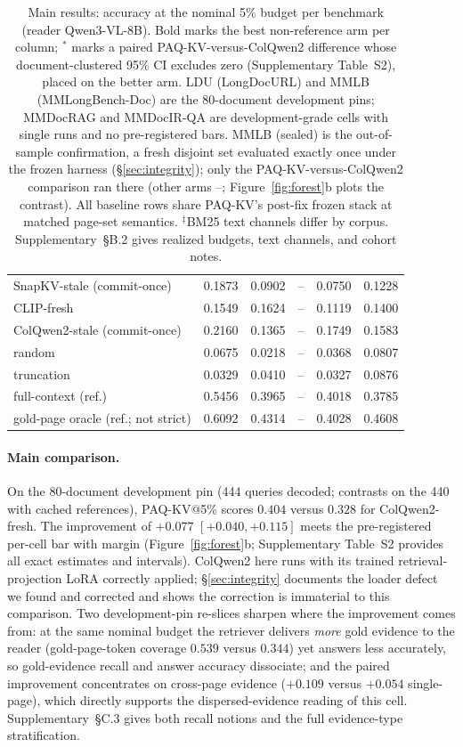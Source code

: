 \documentclass[letterpaper]{article} %
\newcommand{\paqc}{\textsc{PAQ-KV}}
\begin{document}
\begin{table}[t]
\begin{tabular}{lccccc}
SnapKV-stale (commit-once) & 0.1873 & 0.0902 & -- & 0.0750 & 0.1228 \\
CLIP-fresh & 0.1549 & 0.1624 & -- & 0.1119 & 0.1400 \\
ColQwen2-stale (commit-once) & 0.2160 & 0.1365 & -- & 0.1749 & 0.1583 \\
random & 0.0675 & 0.0218 & -- & 0.0368 & 0.0807 \\
truncation & 0.0329 & 0.0410 & -- & 0.0327 & 0.0876 \\
\midrule
full-context (ref.) & 0.5456 & 0.3965 & -- & 0.4018 & 0.3785 \\
gold-page oracle (ref.; not strict) & 0.6092 & 0.4314 & -- & 0.4028 & 0.4608 \\
\bottomrule
\end{tabular}
\caption{Main results: accuracy at the nominal 5\% budget per benchmark
(reader Qwen3-VL-8B). Bold marks the best non-reference arm per column;
$^{*}$ marks a paired \paqc{}-versus-ColQwen2 difference whose
document-clustered 95\% CI excludes zero (Supplementary Table~S2),
placed on the better arm. LDU (LongDocURL) and MMLB (MMLongBench-Doc) are
the 80-document development pins; MMDocRAG and MMDocIR-QA are
development-grade cells with single runs and no pre-registered bars. MMLB
(sealed) is the out-of-sample confirmation, a fresh disjoint set evaluated
exactly once under the frozen harness (\S\ref{sec:integrity}); only the
\paqc{}-versus-ColQwen2 comparison ran there (other arms --;
Figure~\ref{fig:forest}b plots the contrast). All baseline rows share
\paqc{}'s post-fix frozen stack at matched page-set semantics.
$^\ddagger$BM25 text channels differ by corpus.
Supplementary~\S B.2 gives realized budgets, text channels, and
cohort notes.}
\label{tab:paqkv}
\end{table}

\paragraph{Main comparison.} On the 80-document development pin (444 queries
decoded; contrasts on the 440 with cached references), \paqc{}@5\% scores
$0.404$ versus $0.328$ for ColQwen2-fresh. The improvement of $+0.077$
$[+0.040,+0.115]$ meets the pre-registered per-cell bar with margin
(Figure~\ref{fig:forest}b; Supplementary Table~S2 provides all exact
estimates and intervals). ColQwen2 here runs with its trained
retrieval-projection LoRA correctly applied; \S\ref{sec:integrity} documents
the loader defect we found and corrected and shows the correction is
immaterial to this comparison. Two development-pin re-slices sharpen where the
improvement comes from: at the same nominal budget the retriever delivers
\emph{more} gold evidence to the reader (gold-page-token coverage $0.539$
versus $0.344$) yet answers less accurately, so gold-evidence recall and
answer accuracy dissociate; and the paired improvement concentrates on
cross-page evidence ($+0.109$ versus $+0.054$ single-page), which directly
supports the dispersed-evidence reading of this cell. Supplementary~\S C.3
gives both recall notions and the full evidence-type stratification.
\end{document}
